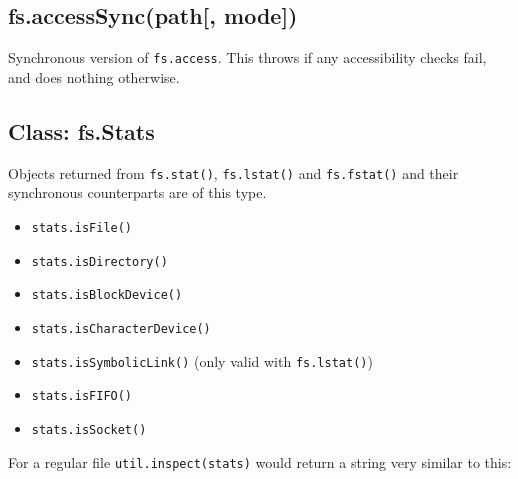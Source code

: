 \subsection{fs.accessSync(path{[},
mode{]})}\label{fs.accesssyncpath-mode}

Synchronous version of \texttt{fs.access}. This throws if any
accessibility checks fail, and does nothing otherwise.

\subsection{Class: fs.Stats}\label{class-fs.stats}

Objects returned from \texttt{fs.stat()}, \texttt{fs.lstat()} and
\texttt{fs.fstat()} and their synchronous counterparts are of this type.

\begin{itemize}
\itemsep1pt\parskip0pt
\item
  \texttt{stats.isFile()}
\item
  \texttt{stats.isDirectory()}
\item
  \texttt{stats.isBlockDevice()}
\item
  \texttt{stats.isCharacterDevice()}
\item
  \texttt{stats.isSymbolicLink()} (only valid with \texttt{fs.lstat()})
\item
  \texttt{stats.isFIFO()}
\item
  \texttt{stats.isSocket()}
\end{itemize}

For a regular file \texttt{util.inspect(stats)} would return a string
very similar to this:

\begin{Shaded}
\begin{Highlighting}[]
\NormalTok{\{ }\NormalTok{: }\NormalTok{,}
  \NormalTok{: }\NormalTok{,}
  \NormalTok{: }\NormalTok{,}
  \NormalTok{: }\NormalTok{,}
  \NormalTok{: }\NormalTok{,}
  \NormalTok{: }\NormalTok{,}
  \NormalTok{: }\NormalTok{,}
  \NormalTok{: }\NormalTok{,}
  \NormalTok{: }\NormalTok{,}
  \NormalTok{: }\NormalTok{,}
    \NormalTok{:}\NormalTok{:} 
    \NormalTok{:}\NormalTok{:} 
    \NormalTok{:}\NormalTok{:} 
    \NormalTok{:}\NormalTok{:} 
\end{Highlighting}
\end{Shaded}

